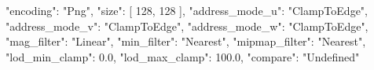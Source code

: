 {
    "encoding": "Png",
    "size": [
        128,
        128
    ],
    "address_mode_u": "ClampToEdge",
    "address_mode_v": "ClampToEdge",
    "address_mode_w": "ClampToEdge",
    "mag_filter": "Linear",
    "min_filter": "Nearest",
    "mipmap_filter": "Nearest",
    "lod_min_clamp": 0.0,
    "lod_max_clamp": 100.0,
    "compare": "Undefined"
}
